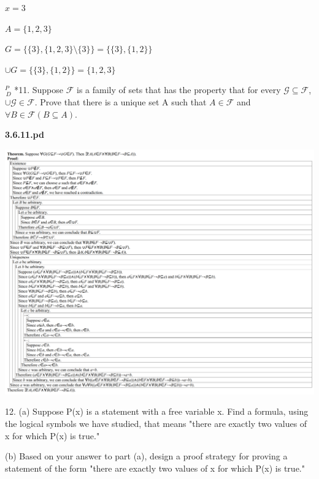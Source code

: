 \documentclass{article}
\begin{document}
$x = 3$

$A = \{1, 2, 3\}$

$G = \{\{3\}, \{1,2,3\} \setminus \{3\}\} = \{\{3\}, \{1,2\}\}$

$\cup G = \{\{3\}, \{1,2\}\} = \{1,2,3\}$

\vspace{30pt}

$^{\textit{P}}_{\, \textit{D}}$ *11. Suppose $\mathcal{F}$ is a family of sets that has the property that for every $\mathcal{G} \subseteq \mathcal{F}$, $\cup \mathcal{G} \in \mathcal{F}$. Prove that there is a unique set A such that $A \in \mathcal{F}$ and $\forall B \in \mathcal{F}(B \subseteq A)$.


\vspace{30pt}

\textbf{3.6.11.pd}
\vspace{10pt}

\includegraphics[width=\textwidth,height=\textheight,keepaspectratio]{3_6_11}

\vspace{30pt}

\hspace{12pt}12. (a) Suppose P(x) is a statement with a free variable x. Find a formula,
using the logical symbols we have studied, that means "there are
exactly two values of x for which P(x) is true."

\hspace{12pt}(b) Based on your answer to part (a), design a proof strategy for proving
a statement of the form "there are exactly two values of x for which
P(x) is true."
\end{document}

